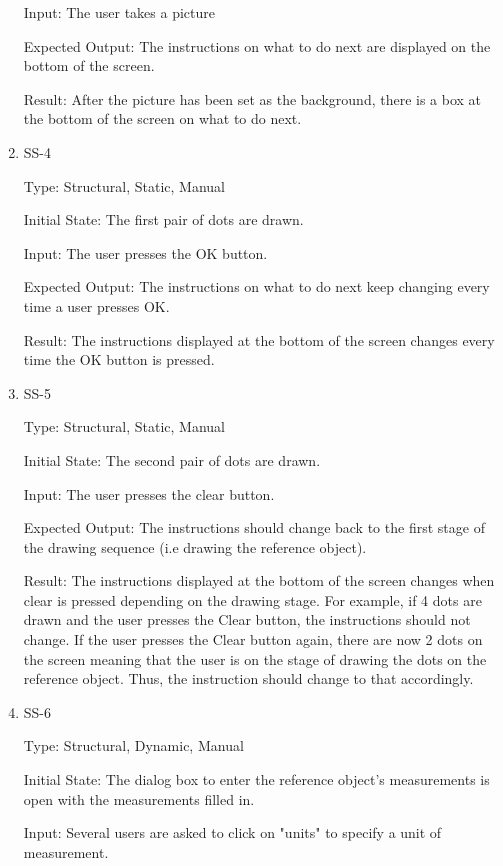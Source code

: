 \documentclass[12pt, titlepage]{article}
\begin{document}
\begin{enumerate}
Input: The user takes a picture
					
Expected Output: The instructions on what to do next are displayed on the bottom of the screen.
					
Result: After the picture has been set as the background, there is a box at the bottom of the screen on what to do next.

\item{SS-4\\}

Type: Structural, Static, Manual
					
Initial State: The first pair of dots are drawn.
					
Input: The user presses the OK button.
					
Expected Output: The instructions on what to do next keep changing every time a user presses OK.
					
Result: The instructions displayed at the bottom of the screen changes every time the OK button is pressed.

\item{SS-5\\}

Type: Structural, Static, Manual
					
Initial State: The second pair of dots are drawn.
					
Input: The user presses the clear button.
					
Expected Output: The instructions should change back to the first stage of the drawing sequence (i.e drawing the reference object).
					
Result: The instructions displayed at the bottom of the screen changes when clear is pressed depending on the drawing stage. For example, if 4 dots are drawn and the user presses the Clear button, the instructions should not change. If the user presses the Clear button again, there are now 2 dots on the screen meaning that the user is on the stage of drawing the dots on the reference object. Thus, the instruction should change to that accordingly.

\item{SS-6\\}

Type: Structural, Dynamic, Manual

Initial State: The dialog box to enter the reference object's measurements is open with the measurements filled in.

Input: Several users are asked to click on "units" to specify a unit of measurement.


\end{enumerate}
\end{document}
